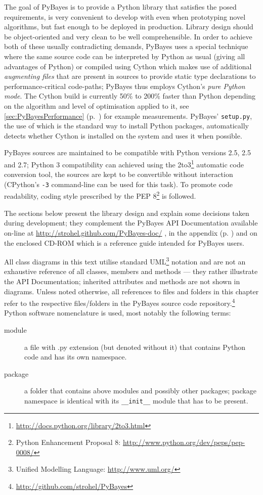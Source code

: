 The goal of PyBayes is to provide a Python library that satisfies the posed requirements, is very
convenient to develop with even when prototyping novel algorithms, but fast enough to be deployed in
production. Library design should be object-oriented and very clean to be well comprehensible.
In order to achieve both of these usually contradicting demands, PyBayes uses a special
technique where the same source code can be interpreted by Python as usual (giving all advantages
of Python) or compiled using Cython which makes use of additional \emph{augmenting files} that are present
in sources to provide static
type declarations to performance-critical code-paths; PyBayes thus employs Cython's \emph{pure Python
mode}. The Cython build is currently 50\% to 200\% faster than Python depending on the algorithm and
level of optimisation applied to it, see \autoref{sec:PyBayesPerformance} (p.~\pageref{sec:PyBayesPerformance})
for example measurements. PyBayes' \verb|setup.py|, the use of which is the standard way to install
Python packages, automatically detects whether Cython is installed on the system and uses it when
possible.

PyBayes sources are maintained to be compatible with Python versions 2.5, 2.5 and 2.7; Python 3
compatibility can achieved using the 2to3\footnote{\url{http://docs.python.org/library/2to3.html}}
automatic code conversion tool, the sources are kept to be convertible without interaction
(CPython's \verb|-3| command-line can be used for this task). To promote code readability, coding
style prescribed by the PEP 8\footnote{Python Enhancement Proposal 8:
\url{http://www.python.org/dev/peps/pep-0008/}} is followed.

The sections below present the library design and explain some decisions taken during development;
they complement the PyBayes API Documentation available on-line at \url{http://strohel.github.com/PyBayes-doc/}%
\ifattachements%
, in the appendix (p. \pageref{chap:APIDocs}) and on the enclosed CD-ROM
\fi
which is a reference guide intended for PyBayes users.

All class diagrams in this text utilise standard UML\footnote{Unified Modelling Language:
\url{http://www.uml.org/}} notation and are not an exhaustive reference of all classes, members and
methods --- they rather illustrate the API Documentation; inherited attributes and methods are not
shown in diagrams. Unless noted otherwise, all references to
files and folders in this chapter refer to the respective files/folders in the PyBayes source code
repository.\footnote{\url{http://github.com/strohel/PyBayes}} Python software nomenclature is used,
most notably the following terms:
\begin{description}
	\item[module] a file with .py extension (but denoted without it) that contains Python code and
		has its own namespace.
	\item[package] a folder that contains above modules and possibly other packages; package
		namespace is identical with its \verb|__init__| module that has to be present.
\end{description}

